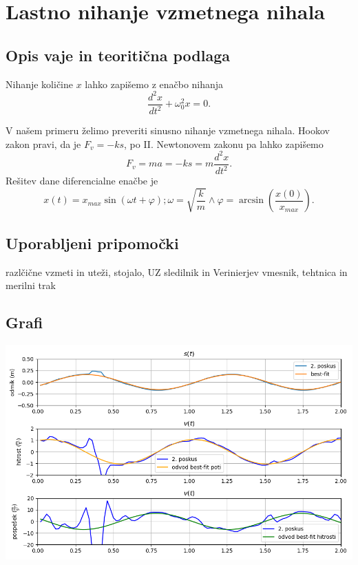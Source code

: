 \documentclass[12pt]{article}
\begin{document}
\section{Lastno nihanje vzmetnega nihala}
	\subsection*{Opis vaje in teoritična podlaga}
	Nihanje količine $x$ lahko zapišemo z enačbo nihanja
	\begin{equation}
		\frac{d^2 x}{dt^2} + \omega_0^2 x = 0 .
	\end{equation}

 

	V našem primeru želimo preveriti sinusno nihanje vzmetnega nihala.
	Hookov zakon pravi, da je $F_v = -ks$, po II. Newtonovem zakonu pa lahko zapišemo 
	\begin{equation}
		F_v = ma = -ks = m \frac{d^2 x}{dt^2} .
	\end{equation}
	Rešitev dane diferencialne enačbe je
	\begin{equation}
		x(t) = x_{max} \sin(\omega t + \varphi); \omega = \sqrt{\frac k m} \land \varphi = \arcsin(\frac{x(0)}{x_{max}}).
	\end{equation}
	
	\subsection*{Uporabljeni pripomočki}
	razlčične vzmeti in uteži, stojalo, UZ sledilnik in Verinierjev vmesnik, tehtnica in merilni trak
	\subsection*{Grafi}
	\includegraphics[width=\linewidth]{slike/graf_v1_1.png}
\end{document}
